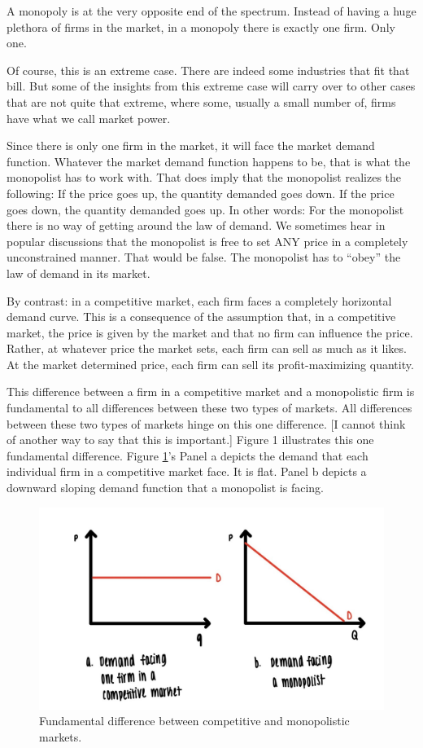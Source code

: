\documentclass[
]{book}
\begin{document}
A monopoly is at the very opposite end of the spectrum. Instead of having a huge plethora of firms in the market, in a monopoly there is exactly one firm. Only one.

Of course, this is an extreme case. There are indeed some industries that fit that bill. But some of the insights from this extreme case will carry over to other cases that are not quite that extreme, where some, usually a small number of, firms have what we call market power.

Since there is only one firm in the market, it will face the market demand function. Whatever the market demand function happens to be, that is what the monopolist has to work with. That does imply that the monopolist realizes the following: If the price goes up, the quantity demanded goes down. If the price goes down, the quantity demanded goes up. In other words: For the monopolist there is no way of getting around the law of demand. We sometimes hear in popular discussions that the monopolist is free to set ANY price in a completely unconstrained manner. That would be false. The monopolist has to ``obey'' the law of demand in its market.

By contrast: in a competitive market, each firm faces a completely horizontal demand curve. This is a consequence of the assumption that, in a competitive market, the price is given by the market and that no firm can influence the price. Rather, at whatever price the market sets, each firm can sell as much as it likes. At the market determined price, each firm can sell its profit-maximizing quantity.

This difference between a firm in a competitive market and a monopolistic firm is fundamental to all differences between these two types of markets. All differences between these two types of markets hinge on this one difference. {[}I cannot think of another way to say that this is important.{]} Figure 1 illustrates this one fundamental difference. Figure \ref{fig:monopoly01}'s Panel a depicts the demand that each individual firm in a competitive market face. It is flat. Panel b depicts a downward sloping demand function that a monopolist is facing.

\begin{figure}

{\centering \includegraphics[width=0.75\linewidth]{img/monopoly/fig1} 

}

\caption{Fundamental difference between competitive and monopolistic markets.}\label{fig:monopoly01}
\end{figure}
\end{document}
